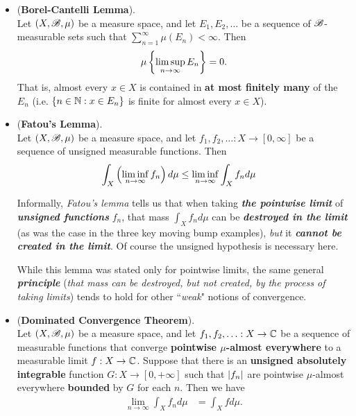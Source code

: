 \documentclass[11pt]{article}
\begin{document}
\begin{itemize}
\item \begin{lemma} (\textbf{Borel-Cantelli Lemma}). \citep{tao2011introduction, resnick2013probability} \\
Let $(X, {\mathscr B}, \mu)$ be a measure space, and let $E_1, E_2,  \ldots$ be a sequence of ${\mathscr B}$-measurable sets such that $\sum_{n=1}^{\infty}\mu(E_n) < \infty$. Then 
\begin{align*}
\mu\left\{ \limsup\limits_{n\rightarrow \infty} E_{n} \right\}  = 0.
\end{align*} That is,  almost every $x \in X$ is contained in \textbf{at most finitely many} of the $E_n$ (i.e. $\left\{ n \in {\mathbb N} : x \in E_n\right\}$ is finite for almost every $x \in X$).
\end{lemma} 

\item 
\begin{corollary} (\textbf{Fatou's Lemma}). \\
Let $(X, {\mathscr B}, \mu)$ be a measure space, and let $f_1, f_2, \ldots : X\rightarrow [0,\infty]$ be a sequence of unsigned measurable functions. Then
\begin{align*}
\int_{X}\left(\liminf\limits_{n\rightarrow \infty} f_{n}\right) d\mu &\le \liminf\limits_{n\rightarrow \infty}\int_{X}f_{n} d\mu 
\end{align*}
\end{corollary}

\begin{remark}
Informally, \emph{Fatou's lemma} tells us that when taking \emph{\textbf{the pointwise limit}} of \textit{\textbf{unsigned functions}} $f_n$, that mass
$\int_{X}f_{n} d\mu$ can be \emph{\textbf{destroyed in the limit}} (as was the case in the three key moving bump examples), \emph{but} it \emph{\textbf{cannot be created in the limit}}. Of course the unsigned hypothesis is necessary here.

While this lemma was stated only for pointwise limits, the same general \emph{\textbf{principle}} (\emph{that mass can be destroyed, but not created, by the process of taking limits}) tends to hold for other ``\emph{weak}" notions of convergence.
\end{remark}

\item \begin{theorem} (\textbf{Dominated Convergence Theorem}). \\
Let $(X, {\mathscr B}, \mu)$ be a measure space, and let $f_1, f_2, \ldots : X\rightarrow {\mathbb C}$ be a sequence of measurable functions that converge \textbf{pointwise $\mu$-almost everywhere} to a measurable limit $f : X\rightarrow {\mathbb C}$. Suppose that there is an \textbf{unsigned absolutely integrable} function $G : X\rightarrow [0, +\infty]$ such that $\left\lvert f_n \right\rvert$ are pointwise $\mu$-almost everywhere \textbf{bounded} by $G$ for each $n$. Then we have
\begin{align*}
\lim\limits_{n\rightarrow \infty}\int_{X}f_{n}d\mu  &= \int_{X}f d\mu.
\end{align*}
\end{theorem}


\end{itemize}
\end{document}
